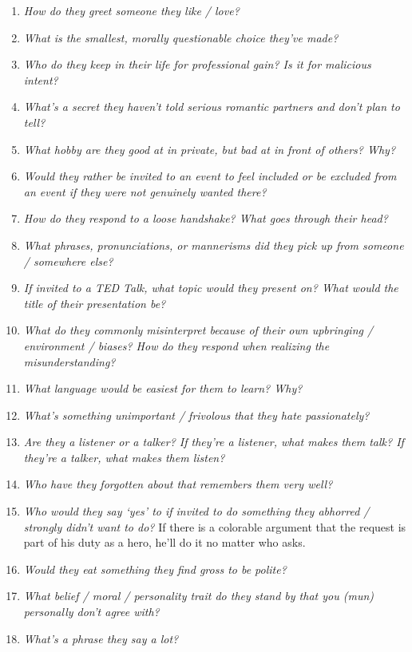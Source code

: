 \begin{enumerate}
    \item\textit{How do they greet someone they like / love?}
    \item\textit{What is the smallest, morally questionable choice they’ve made?}
    \item\textit{Who do they keep in their life for professional gain? Is it for malicious intent?}
    \item\textit{What’s a secret they haven’t told serious romantic partners and don’t plan to tell?}
    \item\textit{What hobby are they good at in private, but bad at in front of others? Why?}
    \item\textit{Would they rather be invited to an event to feel included or be excluded from an event if they were not genuinely wanted there?}
    \item\textit{How do they respond to a loose handshake? What goes through their head?}
    \item\textit{What phrases, pronunciations, or mannerisms did they pick up from someone / somewhere else?}
    \item\textit{If invited to a TED Talk, what topic would they present on? What would the title of their presentation be?}
    \item\textit{What do they commonly misinterpret because of their own upbringing / environment / biases? How do they respond when realizing the misunderstanding?}
    \item\textit{What language would be easiest for them to learn? Why?}
    \item\textit{What’s something unimportant / frivolous that they hate passionately?}
    \item\textit{Are they a listener or a talker? If they’re a listener, what makes them talk? If they’re a talker, what makes them listen?}
    \item\textit{Who have they forgotten about that remembers them very well?}
    \item\textit{Who would they say ‘yes’ to if invited to do something they abhorred / strongly didn’t want to do?} If there is a colorable argument that the request is part of his duty as a hero, he'll do it no matter who asks. 
    \item\textit{Would they eat something they find gross to be polite?}
    \item\textit{What belief / moral / personality trait do they stand by that you (mun) personally don’t agree with?}
    \item\textit{What’s a phrase they say a lot?}

\end{enumerate}
